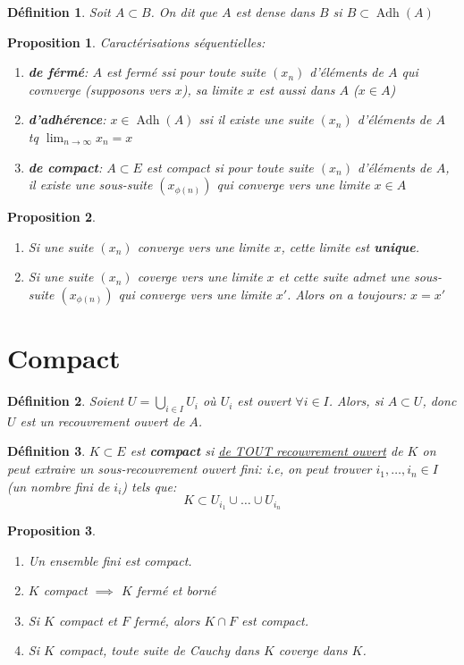 \documentclass[a4paper]{article}
\newtheorem{definition}{Définition}[section]
\newtheorem{proposition}{Proposition}[section]
\begin{document}
\begin{definition}
    Soit $A \subset B$. On dit que $A$ est dense dans  $B$ si  $B \subset \operatorname{Adh}(A)$
\end{definition}
\begin{proposition} Caractérisations séquentielles:
   \begin{enumerate}
       \item \textbf{de férmé}: $A$ est fermé ssi pour toute suite  $(x_n)$ d'éléments de  $A$ qui covnverge (supposons vers $x$), sa limite $x$ est aussi dans  $A$ ($x \in A$)
       \item \textbf{d'adhérence}: $x \in \operatorname{Adh}(A)$ ssi il existe une suite  $(x_n)$ d'éléments de  $A$ tq  $\lim_{n \to \infty} x_n = x$
       \item \textbf{de compact}: $A \subset E$ est compact si pour toute suite $(x_n)$ d'éléments de  $A$, il existe une sous-suite  $(x_{\phi(n)})$ qui converge vers une limite  $x \in A$
   \end{enumerate} 
\end{proposition}
\begin{proposition}
   \begin{enumerate}
       \item Si une suite $(x_n)$ converge vers une limite  $x$, cette limite est \textbf{unique}.
       \item Si une suite  $(x_n)$ coverge vers une limite  $x$ et cette suite admet une sous-suite  $(x_{\phi(n)})$ qui converge vers une limite  $x'$. Alors on a toujours:  $x = x'$
   \end{enumerate} 
\end{proposition}
\section{Compact}
\begin{definition}
    Soient $U = \bigcup_{i \in I} U_i$ où $U_i$ est ouvert  $\forall i \in I$. Alors, si $A \subset U$, donc $U$ est un recouvrement ouvert de  $A$.
\end{definition}
\begin{definition}
    $K \subset E$ est \textbf{compact} si \underline{de TOUT recouvrement ouvert} de $K$ on peut extraire un sous-recouvrement ouvert fini: i.e, on peut trouver $i_1, \ldots, i_n \in I$ (un nombre fini de $i_i$) tels que:
    \[
        K \subset U_{i_1} \cup \ldots \cup U_{i_n}
    \] 
\end{definition}
\begin{proposition}
   \begin{enumerate}
       \item Un ensemble fini est compact.
       \item $K$ compact $\implies$ $K$ fermé et borné
       \item Si $K$ compact et $F$ fermé, alors  $K \cap F$ est compact.
       \item Si  $K$ compact, toute suite de Cauchy dans  $K$ coverge dans  $K$.
   \end{enumerate} 
\end{proposition}
\end{document}
